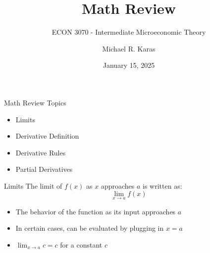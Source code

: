 \documentclass[aspectratio=169]{beamer}
\author{Michael R. Karas}
\title{Math Review}
\subtitle{ECON 3070 - Intermediate Microeconomic Theory}
\date{January 15, 2025}
\begin{document}
\begin{frame}
  \titlepage
\end{frame}

\begin{frame}{Math Review Topics}\label{main1}
\begin{itemize}
	\begin{itemize}
		\item Limits
		\item Derivative Definition
		\item Derivative Rules
		\item Partial Derivatives
	\end{itemize}
\end{itemize}

\end{frame}

\begin{frame}{Limits}\label{main1}
	The limit of \( f(x) \) as \( x \) approaches \( a \) is written as:
\[
\lim_{x \to a} f(x)
\]
\begin{itemize}
\begin{itemize}
	\item The behavior of the function as its input approaches \( a \)
	\item In certain cases, can be evaluated by plugging in \( x = a \)
	\item \( \lim_{x \to a} c = c \) for a constant \( c \)
\end{itemize}
\end{itemize}

\end{frame}
\end{document}
